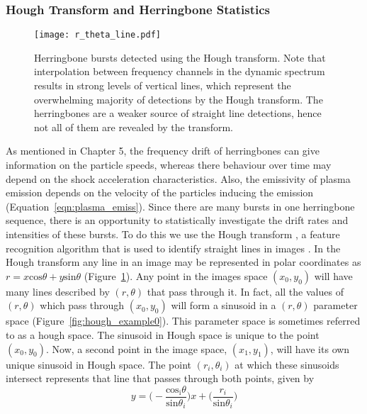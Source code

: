 \subsubsection{Hough Transform and Herringbone Statistics}
\begin{figure}[t!]
\begin{center}
\texttt{[image: r\_theta\_line.pdf]}
\caption[Hough transform herringbones]{Herringbone bursts detected using the Hough transform. Note that interpolation between frequency channels in the dynamic spectrum results in strong levels of vertical lines, which represent the overwhelming majority of detections by the Hough transform. The herringbones are a weaker source of straight line detections, hence not all of them are revealed by the transform.}
\label{fig:r_theta_line}
\end{center}
\end{figure}
As mentioned in Chapter 5, the frequency drift of herringbones can give information on the particle speeds, whereas there behaviour over time may depend on the shock acceleration characteristics. Also, the emissivity of plasma emission depends on the velocity of the particles inducing the emission (Equation~\ref{eqn:plasma_emiss}). Since there are many bursts in one herringbone sequence, there is an opportunity to statistically investigate the drift rates and intensities of these bursts. To do this we use the Hough transform \citep{hough1961}, a feature recognition algorithm that is used to identify straight lines in images \citep{duda1972}. In the Hough transform any line in an image may be represented in polar coordinates as $r=x\mathrm{cos}\theta +y\mathrm{sin}\theta$ (Figure~\ref{fig:r_theta_line}). Any point in the images space $(x_0, y_0)$ will have many lines described by $(r,\theta)$ that pass through it. In fact, all the values of $(r, \theta)$ which pass through $(x_0, y_0)$ will form a sinusoid in a $(r,\theta)$ parameter space (Figure~\ref{fig:hough_example0}). This parameter space is sometimes referred to as a hough space. The sinusoid in Hough space is unique to the point $(x_0, y_0)$. Now, a second point in the image space, $(x_1, y_1)$, will have its own unique sinusoid in Hough space. The point $(r_i,\theta_i)$ at which these sinusoids intersect represents that line that passes through both points, given by
\begin{equation}
y = \bigg(- \frac{\mathrm{cos_i}\theta}{\mathrm{sin}\theta_i}\bigg)x + \bigg(\frac{r_i}{\mathrm{sin}\theta_i}\bigg)
\end{equation}
